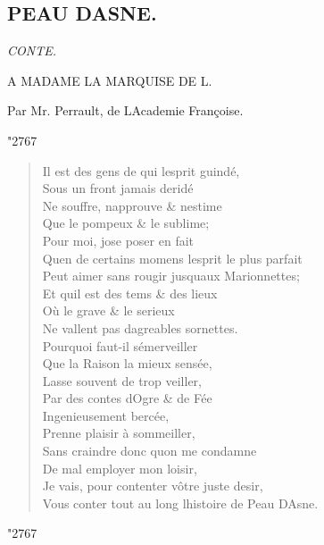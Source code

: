 \documentclass[14pt,a4paper]{memoir}
\newcommand{\spacer}{%
  \par\vspace{1\baselineskip}%
  \begin{center}%
    {\HUGE \char"2767}%
  \end{center}%
  \vspace{1\baselineskip}\par%
}
\begin{document}
{{\begin{otherlanguage}{french}
\chapter{PEAU D\textquotesingle ASNE.}

\begin{flushright}
\itshape
CONTE.

A MADAME LA MARQUISE DE L.

Par Mr. Perrault, de L\textquotesingle Academie Françoise.
\end{flushright}

\spacer

\begin{verse}
Il est des gens de qui l\textquotesingle esprit guindé, \\
Sous un front jamais deridé \\
Ne souffre, n\textquotesingle approuve \& n\textquotesingle estime \\
Que le pompeux \& le sublime; \\
Pour moi, j\textquotesingle ose poser en fait \\
Qu\textquotesingle en de certains momens l\textquotesingle esprit le plus parfait  \\
Peut aimer sans rougir jusqu\textquotesingle aux Marionnettes; \\
Et qu\textquotesingle il est des tems \& des lieux \\
Où le grave \& le serieux \\
Ne vallent pas d\textquotesingle agreables sornettes. \\
Pourquoi faut-il s\textquotesingle émerveiller \\
Que la Raison la mieux sensée, \\
Lasse souvent de trop veiller, \\
Par des contes d\textquotesingle Ogre \& de Fée  \\
Ingenieusement bercée, \\
Prenne plaisir à sommeiller, \\
Sans craindre donc qu\textquotesingle on me condamne \\
De mal employer mon loisir, \\
Je vais, pour contenter vôtre juste desir, \\
Vous conter tout au long l\textquotesingle histoire de Peau D\textquotesingle Asne.
\end{verse}

\spacer


\end{otherlanguage}}}
\end{document}
